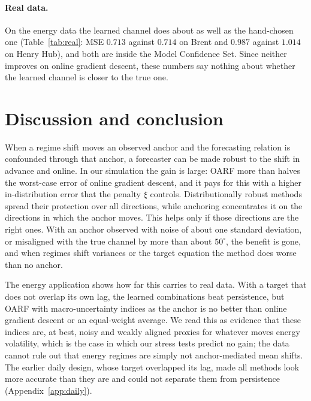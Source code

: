 \documentclass[12pt]{article}
\theoremstyle{plain}
\theoremstyle{remark}
\newcommand{\OARF}{\textsc{OARF}}
\begin{document}
\paragraph{Real data.}
On the energy data the learned channel does about as well as the hand-chosen one
(Table~\ref{tab:real}: MSE $0.713$ against $0.714$ on Brent and $0.987$ against
$1.014$ on Henry Hub), and both are inside the Model Confidence Set. Since neither
improves on online gradient descent, these numbers say nothing about whether the
learned channel is closer to the true one.

\section{Discussion and conclusion}\label{sec:discussion}

When a regime shift moves an observed anchor and the forecasting relation is
confounded through that anchor, a forecaster can be made robust to the shift in
advance and online. In our simulation the gain is large: \OARF{} more than halves the
worst-case error of online gradient descent, and it pays for this with a higher
in-distribution error that the penalty $\xi$ controls. Distributionally robust methods
spread their protection over all directions, while anchoring concentrates it on the
directions in which the anchor moves. This helps only if those directions are the right
ones. With an anchor observed with noise of about one standard deviation, or misaligned
with the true channel by more than about $50^\circ$, the benefit is gone, and when
regimes shift variances or the target equation the method does worse than no anchor.

The energy application shows how far this carries to real data. With a target that
does not overlap its own lag, the learned combinations beat persistence, but \OARF{}
with macro-uncertainty indices as the anchor is no better than online gradient descent
or an equal-weight average. We read this as evidence that these indices are, at best,
noisy and weakly aligned proxies for whatever moves energy volatility, which is the
case in which our stress tests predict no gain; the data cannot rule out that energy
regimes are simply not anchor-mediated mean shifts. The earlier daily design, whose
target overlapped its lag, made all methods look more accurate than they are and could
not separate them from persistence (Appendix~\ref{app:daily}).
\end{document}

